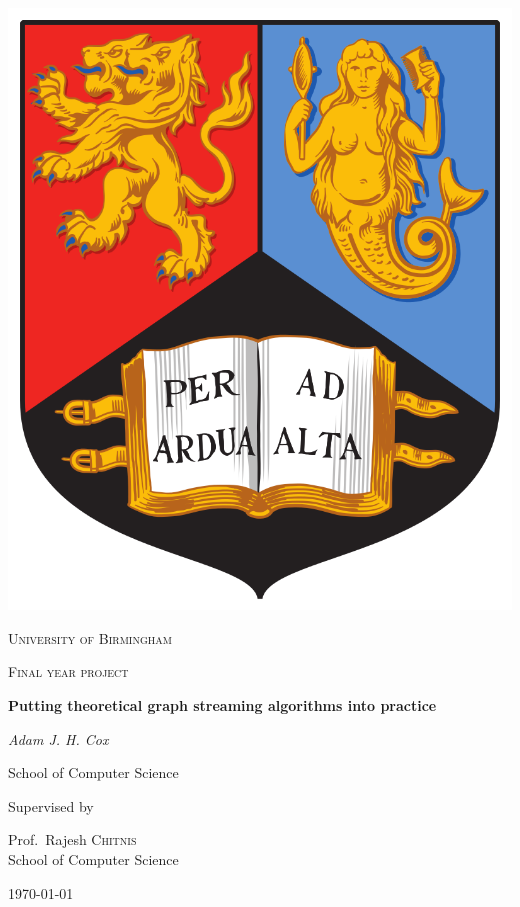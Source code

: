 \begin{titlepage}


\thispagestyle{empty}
\setlength\headheight{0pt} 
\begin{center}

    \center\includegraphics[width=0.25\linewidth]{img/uob.PNG}            

    \vspace{0.25cm}
    {\scshape\LARGE University of Birmingham \par}
    \vspace{0.25cm}
    {\scshape\Large Final year project\par}
    \vspace{0.5cm}

    {\Large\bfseries Putting theoretical graph streaming algorithms into practice\par}
    
    \vspace{0.5cm}
    {\Large\itshape Adam J. H. Cox\par}
    School of Computer Science
    \vspace{0.25cm}

    \vspace{1cm}
    Supervised by\par
    Prof.~Rajesh \textsc{Chitnis} \\
    School of Computer Science\par
    \vspace{1.5cm}
    \large
    \today

\end{center}

\clearpage
\restoregeometry
\end{titlepage}
